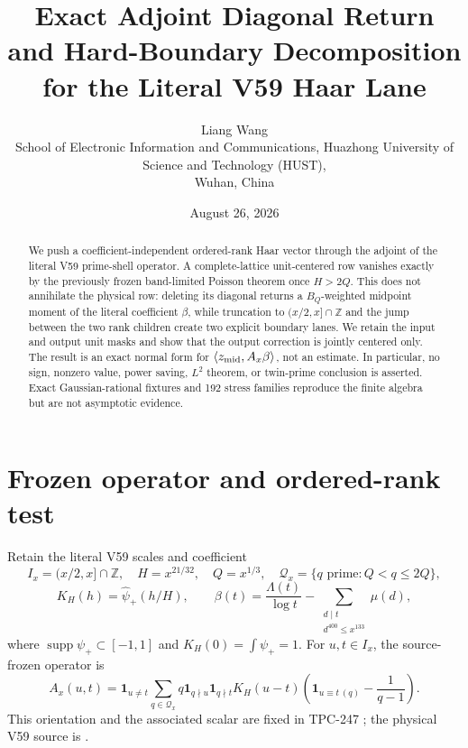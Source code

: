 \documentclass[10pt]{article}
\title{Exact Adjoint Diagonal Return and Hard-Boundary Decomposition\\
for the Literal V59 Haar Lane}
\author{Liang Wang\\
\small School of Electronic Information and Communications, Huazhong University of Science and Technology (HUST),\\
\small Wuhan, China}
\date{August 26, 2026}
\newcommand{\Z}{\mathbb Z}
\newcommand{\one}{\mathbf 1}
\newcommand{\ip}[2]{\langle #1,#2\rangle}
\newcommand{\zm}{z_{\rm mid}}
\newcommand{\Ax}{A_x}
\newcommand{\Qx}{\mathcal Q_x}
\begin{document}
\maketitle

\begin{abstract}
We push a coefficient-independent ordered-rank Haar vector through the adjoint
of the literal V59 prime-shell operator.  A complete-lattice unit-centered row
vanishes exactly by the previously frozen band-limited Poisson theorem once
$H>2Q$.  This does not annihilate the physical row: deleting its diagonal
returns a $B_Q$-weighted midpoint moment of the literal coefficient $\beta$,
while truncation to $(x/2,x]\cap\mathbb Z$ and the jump between the two rank
children create two explicit boundary lanes.  We retain the input and output
unit masks and show that the output correction is jointly centered only.  The
result is an exact normal form for $\ip{\zm}{\Ax\beta}$, not an estimate.  In
particular, no sign, nonzero value, power saving, $L^2$ theorem, or twin-prime
conclusion is asserted.  Exact Gaussian-rational fixtures and 192 stress
families reproduce the finite algebra but are not asymptotic evidence.
\end{abstract}

\section{Frozen operator and ordered-rank test}

Retain the literal V59 scales and coefficient
\begin{equation}
 I_x=(x/2,x]\cap\Z,\quad H=x^{21/32},\quad Q=x^{1/3},\quad
 \Qx=\{q\text{ prime}:Q<q\leq2Q\},                    \label{eq:scales}
\end{equation}
\begin{equation}
 K_H(h)=\widehat\psi_+(h/H),\qquad
 \beta(t)=\frac{\Lambda(t)}{\log t}
 -\sum_{\substack{d\mid t\\d^{400}\leq x^{133}}}\mu(d),       \label{eq:beta}
\end{equation}
where $\operatorname{supp}\psi_+\subset[-1,1]$ and
$K_H(0)=\int\psi_+=1$.  For $u,t\in I_x$, the source-frozen operator is
\begin{equation}
 \Ax(u,t)=\one_{u\ne t}\sum_{q\in\Qx}q\one_{q\nmid u}\one_{q\nmid t}
 K_H(u-t)\left(\one_{u\equiv t\,(q)}-\frac1{q-1}\right).        \label{eq:operator}
\end{equation}
This orientation and the associated scalar are fixed in TPC-247
\cite{tpc247}; the physical V59 source is \cite{v59}.
\end{document}
